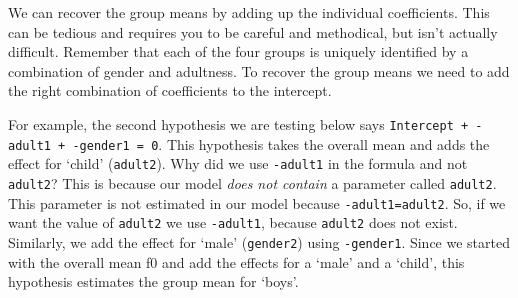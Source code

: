 \documentclass[
]{book}
\newenvironment{Shaded}{\begin{snugshade}}{\end{snugshade}}
\newcommand{\CommentTok}[1]{\textcolor[rgb]{0.56,0.35,0.01}{\textit{#1}}}
\newcommand{\DecValTok}[1]{\textcolor[rgb]{0.00,0.00,0.81}{#1}}
\newcommand{\DocumentationTok}[1]{\textcolor[rgb]{0.56,0.35,0.01}{\textbf{\textit{#1}}}}
\newcommand{\FunctionTok}[1]{\textcolor[rgb]{0.00,0.00,0.00}{#1}}
\newcommand{\NormalTok}[1]{#1}
\newcommand{\OtherTok}[1]{\textcolor[rgb]{0.56,0.35,0.01}{#1}}
\newcommand{\SpecialCharTok}[1]{\textcolor[rgb]{0.00,0.00,0.00}{#1}}
\newcommand{\StringTok}[1]{\textcolor[rgb]{0.31,0.60,0.02}{#1}}
\begin{document}
We can recover the group means by adding up the individual coefficients. This can be tedious and requires you to be careful and methodical, but isn't actually difficult. Remember that each of the four groups is uniquely identified by a combination of gender and adultness. To recover the group means we need to add the right combination of coefficients to the intercept.

For example, the second hypothesis we are testing below says \texttt{Intercept\ +\ -adult1\ +\ -gender1\ =\ 0}. This hypothesis takes the overall mean and adds the effect for `child' (\texttt{adult2}). Why did we use \texttt{-adult1} in the formula and not \texttt{adult2}? This is because our model \emph{does not contain} a parameter called \texttt{adult2}. This parameter is not estimated in our model because \texttt{-adult1=adult2}. So, if we want the value of \texttt{adult2} we use \texttt{-adult1}, because \texttt{adult2} does not exist. Similarly, we add the effect for `male' (\texttt{gender2}) using \texttt{-gender1}. Since we started with the overall mean f0 and add the effects for a `male' and a `child', this hypothesis estimates the group mean for `boys'.

\begin{Shaded}
\end{Shaded}
\end{document}
